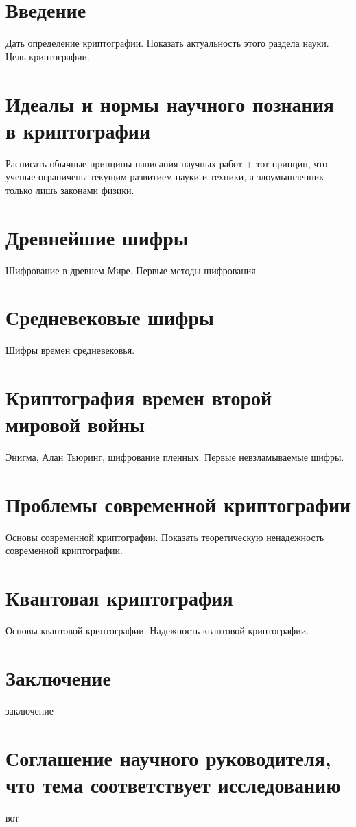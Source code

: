





\section*{Введение}
Дать определение криптографии. Показать актуальность этого раздела науки. Цель криптографии.

\section{Идеалы и нормы научного познания в криптографии}
Расписать обычные принципы написания научных работ + тот принцип, что ученые ограничены текущим развитием науки и техники, а злоумышленник только лишь законами физики.

\section{Древнейшие шифры}
Шифрование в древнем Мире. Первые методы шифрования.

\section{Средневековые шифры}
Шифры времен средневековья.

\section{Криптография времен второй мировой войны}
Энигма, Алан Тьюринг, шифрование пленных. Первые невзламываемые шифры.

\section{Проблемы современной криптографии}
Основы современной криптографии. Показать теоретическую ненадежность современной криптографии.

\section{Квантовая криптография}
Основы квантовой криптографии. Надежность квантовой криптографии.

\section{Заключение}
заключение



\section*{Соглашение научного руководителя, что тема соответствует исследованию}
вот

